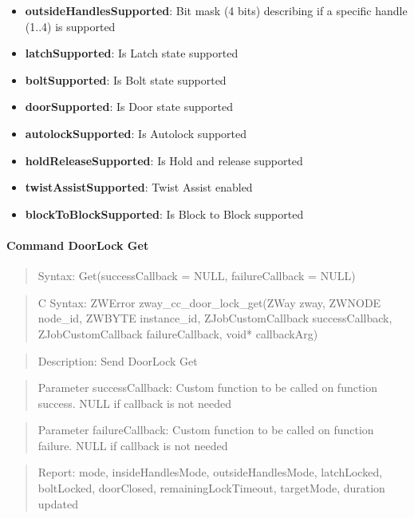 \begin{itemize}
\item \textbf{outsideHandlesSupported}: Bit mask (4 bits) describing if a specific handle (1..4) is supported
\item \textbf{latchSupported}: Is Latch state supported
\item \textbf{boltSupported}: Is Bolt state supported
\item \textbf{doorSupported}: Is Door state supported
\item \textbf{autolockSupported}: Is Autolock supported
\item \textbf{holdReleaseSupported}: Is Hold and release supported
\item \textbf{twistAssistSupported}: Twist Assist enabled
\item \textbf{blockToBlockSupported}: Is Block to Block supported
\end{itemize}

\paragraph{Command DoorLock Get}
\begin{quote}Syntax: Get(successCallback = NULL, failureCallback = NULL)\end{quote}
\begin{quote}C Syntax: ZWError zway\_cc\_door\_lock\_get(ZWay zway, ZWNODE node\_id, ZWBYTE instance\_id, ZJobCustomCallback successCallback, ZJobCustomCallback failureCallback, void* callbackArg)\end{quote}
\begin{quote}Description: Send DoorLock Get\end{quote}
\begin{quote}Parameter successCallback: Custom function to be called on function success. NULL if callback is not needed\end{quote}
\begin{quote}Parameter failureCallback: Custom function to be called on function failure. NULL if callback is not needed\end{quote}
\begin{quote}Report: mode, insideHandlesMode, outsideHandlesMode, latchLocked, boltLocked, doorClosed, remainingLockTimeout, targetMode, duration updated\end{quote}

